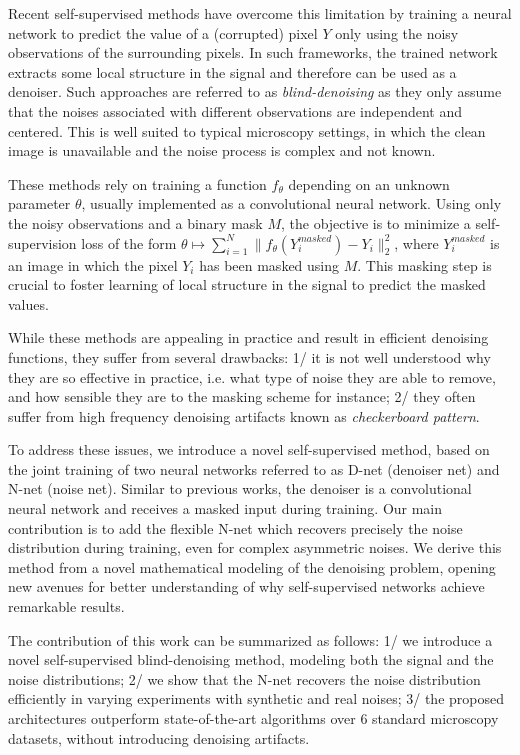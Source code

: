 \documentclass{article}
\begin{document}
Recent self-supervised methods have overcome this limitation \cite{batson2019noise2self,krull2018noise2void} by training a neural network to predict the value of a (corrupted) pixel $Y$ only using the noisy observations of the surrounding pixels. In such frameworks, the trained network extracts some local structure in the signal and therefore can be used as a denoiser. Such approaches are referred to as \textit{blind-denoising} as they only assume that the noises associated with different observations are independent and centered.
This is well suited to typical microscopy settings, in which the clean image is unavailable and the noise process is complex and not known.

These methods rely on training a function $f_\theta$ depending on an unknown parameter $\theta$, usually implemented as a convolutional neural network. Using only the noisy observations and a binary mask $M$, the objective is to minimize a self-supervision loss of the form $\theta\mapsto \sum_{i=1}^N \|f_\theta(Y^{masked}_i) - Y_i\|_2^2$,
where $Y^{masked}_i$ is an image in which the pixel $Y_i$ has been masked using $M$. This masking step is crucial to foster learning of local structure in the signal to predict the masked values.

While these methods are appealing in practice and result in efficient denoising functions, they suffer from several drawbacks:
1/ it is not well understood why they are so effective in practice, i.e. what type of noise they are able to remove, and how sensible they are to the masking scheme for instance;
2/ they often suffer from high frequency denoising artifacts known as \textit{checkerboard pattern}.

To address these issues, we introduce a novel self-supervised method, based on the joint training of two neural networks referred to as D-net (denoiser net) and N-net (noise net). Similar to previous works, the denoiser is a convolutional neural network and receives a masked input during training.
Our main contribution is to add the flexible N-net which recovers precisely the noise distribution during training, even for complex asymmetric noises.
We derive this method from a novel mathematical modeling of the denoising problem, opening new avenues for better understanding of why self-supervised networks achieve remarkable results.

The contribution of this work can be summarized as follows:
1/ we introduce a novel self-supervised blind-denoising method, modeling both the signal and the noise distributions;
2/ we show that the N-net recovers the noise distribution efficiently in varying experiments with synthetic and real noises;
3/ the proposed architectures outperform state-of-the-art algorithms over 6 standard microscopy datasets, without introducing denoising artifacts.
\end{document}

